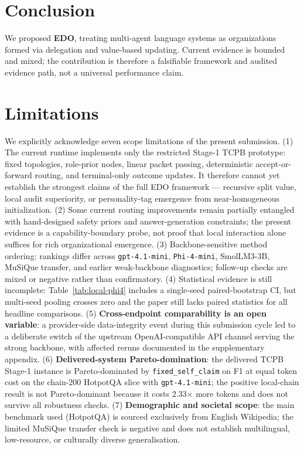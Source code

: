 \documentclass[11pt]{article}
\begin{document}
\section{Conclusion}

We proposed \textbf{EDO}, treating multi-agent language systems as organizations formed via delegation and value-based updating. Current evidence is bounded and mixed; the contribution is therefore a falsifiable framework and audited evidence path, not a universal performance claim.

\section*{Limitations}
\label{sec:limitations}

We explicitly acknowledge seven scope limitations of the present submission. (1) The current runtime implements only the restricted Stage-1 TCPB prototype: fixed topologies, role-prior nodes, linear packet passing, deterministic accept-or-forward routing, and terminal-only outcome updates. It therefore cannot yet establish the strongest claims of the full EDO framework --- recursive split value, local audit superiority, or personality-tag emergence from near-homogeneous initialization. (2) Some current routing improvements remain partially entangled with hand-designed safety priors and answer-generation constraints; the present evidence is a capability-boundary probe, not proof that local interaction alone suffices for rich organizational emergence. (3) Backbone-sensitive method ordering: rankings differ across \texttt{gpt-4.1-mini}, \texttt{Phi-4-mini}, SmolLM3-3B, MuSiQue transfer, and earlier weak-backbone diagnostics; follow-up checks are mixed or negative rather than confirmatory. (4) Statistical evidence is still incomplete: Table~\ref{tab:local-phi4} includes a single-seed paired-bootstrap CI, but multi-seed pooling crosses zero and the paper still lacks paired statistics for all headline comparisons. (5) \textbf{Cross-endpoint comparability is an open variable}: a provider-side data-integrity event during this submission cycle led to a deliberate switch of the upstream OpenAI-compatible API channel serving the strong backbone, with affected reruns documented in the supplementary appendix. (6) \textbf{Delivered-system Pareto-domination}: the delivered TCPB Stage-1 instance is Pareto-dominated by \texttt{fixed\_self\_claim} on F1 at equal token cost on the chain-200 HotpotQA slice with \texttt{gpt-4.1-mini}; the positive local-chain result is not Pareto-dominant because it costs 2.33$\times$ more tokens and does not survive all robustness checks. (7) \textbf{Demographic and societal scope}: the main benchmark used (HotpotQA) is sourced exclusively from English Wikipedia; the limited MuSiQue transfer check is negative and does not establish multilingual, low-resource, or culturally diverse generalisation.
\end{document}

